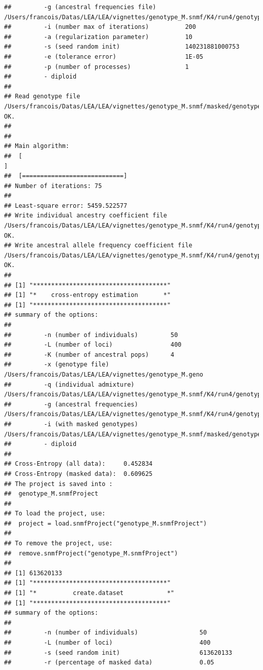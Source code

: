 \documentclass[12pt,a4paper,oneside]{article}\usepackage[]{graphicx}\usepackage[]{color}
\makeatletter
\newenvironment{kframe}{%
 \def\at@end@of@kframe{}%
 \ifinner\ifhmode%
  \def\at@end@of@kframe{\end{minipage}}%
  \begin{minipage}{\columnwidth}%
 \fi\fi%
 \def\FrameCommand##1{\hskip\@totalleftmargin \hskip-\fboxsep
 \colorbox{shadecolor}{##1}\hskip-\fboxsep
     \hskip-\linewidth \hskip-\@totalleftmargin \hskip\columnwidth}%
 \MakeFramed {\advance\hsize-\width
   \@totalleftmargin\z@ \linewidth\hsize
   \@setminipage}}%
 {\par\unskip\endMakeFramed%
 \at@end@of@kframe}
\newenvironment{knitrout}{}{} %
\makeatother
\begin{document}
\begin{knitrout}
\begin{kframe}
\begin{verbatim}
##         -g (ancestral frequencies file)        /Users/francois/Datas/LEA/LEA/vignettes/genotype_M.snmf/K4/run4/genotype_M_r4.4.G
##         -i (number max of iterations)          200
##         -a (regularization parameter)          10
##         -s (seed random init)                  140231881000753
##         -e (tolerance error)                   1E-05
##         -p (number of processes)               1
##         - diploid
## 
## Read genotype file /Users/francois/Datas/LEA/LEA/vignettes/genotype_M.snmf/masked/genotype_M_I.geno:		OK.
## 
## 
## Main algorithm:
## 	[                                                                           ]
## 	[============================]
## Number of iterations: 75
## 
## Least-square error: 5459.522577
## Write individual ancestry coefficient file /Users/francois/Datas/LEA/LEA/vignettes/genotype_M.snmf/K4/run4/genotype_M_r4.4.Q:		OK.
## Write ancestral allele frequency coefficient file /Users/francois/Datas/LEA/LEA/vignettes/genotype_M.snmf/K4/run4/genotype_M_r4.4.G:	OK.
## 
## [1] "*************************************"
## [1] "*    cross-entropy estimation       *"
## [1] "*************************************"
## summary of the options:
## 
##         -n (number of individuals)         50
##         -L (number of loci)                400
##         -K (number of ancestral pops)      4
##         -x (genotype file)                 /Users/francois/Datas/LEA/LEA/vignettes/genotype_M.geno
##         -q (individual admixture)          /Users/francois/Datas/LEA/LEA/vignettes/genotype_M.snmf/K4/run4/genotype_M_r4.4.Q
##         -g (ancestral frequencies)         /Users/francois/Datas/LEA/LEA/vignettes/genotype_M.snmf/K4/run4/genotype_M_r4.4.G
##         -i (with masked genotypes)         /Users/francois/Datas/LEA/LEA/vignettes/genotype_M.snmf/masked/genotype_M_I.geno
##         - diploid
## 
## Cross-Entropy (all data):	 0.452834
## Cross-Entropy (masked data):	 0.609625
## The project is saved into :
##  genotype_M.snmfProject 
## 
## To load the project, use:
##  project = load.snmfProject("genotype_M.snmfProject")
## 
## To remove the project, use:
##  remove.snmfProject("genotype_M.snmfProject")
## 
## [1] 613620133
## [1] "*************************************"
## [1] "*          create.dataset            *"
## [1] "*************************************"
## summary of the options:
## 
##         -n (number of individuals)                 50
##         -L (number of loci)                        400
##         -s (seed random init)                      613620133
##         -r (percentage of masked data)             0.05

\end{verbatim}
\end{kframe}
\end{knitrout}
\end{document}
